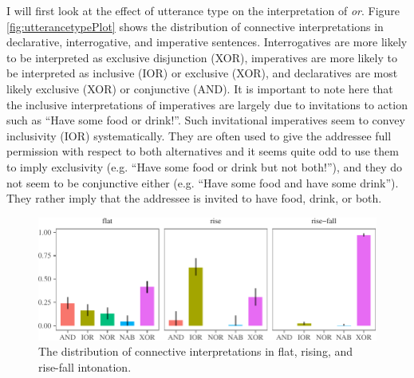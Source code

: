 \documentclass[oneside]{report}
\theoremstyle{definition}
\theoremstyle{definition}
\theoremstyle{definition}
\theoremstyle{remark}
\begin{document}
I will first look at the effect of utterance type on the interpretation
of \emph{or}. Figure \ref{fig:utterancetypePlot} shows the distribution
of connective interpretations in declarative, interrogative, and
imperative sentences. Interrogatives are more likely to be interpreted
as exclusive disjunction (XOR), imperatives are more likely to be
interpreted as inclusive (IOR) or exclusive (XOR), and declaratives are
most likely exclusive (XOR) or conjunctive (AND). It is important to
note here that the inclusive interpretations of imperatives are largely
due to invitations to action such as ``Have some food or drink!''. Such
invitational imperatives seem to convey inclusivity (IOR)
systematically. They are often used to give the addressee full
permission with respect to both alternatives and it seems quite odd to
use them to imply exclusivity (e.g. ``Have some food or drink but not
both!''), and they do not seem to be conjunctive either (e.g. ``Have
some food and have some drink''). They rather imply that the addressee
is invited to have food, drink, or both.
\begin{figure}[tb]

{\centering \includegraphics{figs/intonationPlot-1} 

}

\caption{The distribution of connective interpretations in flat, rising, and rise-fall intonation.}\label{fig:intonationPlot}
\end{figure}
\newline
\end{document}
